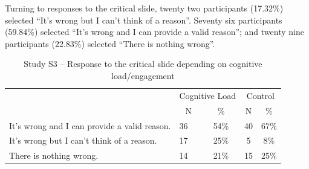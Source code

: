 \documentclass[
  american,
  man,floatsintext]{apa7}
\begin{document}
Turning to responses to the critical slide, twenty two participants (17.32\%) selected \enquote{It's wrong but I can't think of a reason}. Seventy six participants (59.84\%) selected \enquote{It's wrong and I can provide a valid reason}; and twenty nine participants (22.83\%) selected \enquote{There is nothing wrong}.

\begin{table}[tbp]

\begin{center}
\begin{threeparttable}

\caption{\label{tab:tabS3tab1dumb1all}Study S3 – Response to the critical slide depending on cognitive load/engagement}

\begin{tabular}{llccc}
\toprule
 & \multicolumn{2}{c}{Cognitive Load} & \multicolumn{2}{c}{Control} \\
\cmidrule(r){2-3} \cmidrule(r){4-5}
 & \multicolumn{1}{c}{N} & \multicolumn{1}{c}{\%} & \multicolumn{1}{c}{N} & \multicolumn{1}{c}{\%}\\
\midrule
It's wrong and I can provide a valid reason. & 36 & 54\% & 40 & 67\%\\
It's wrong but I can't think of a reason. & 17 & 25\% & 5 & 8\%\\
There is nothing wrong. & 14 & 21\% & 15 & 25\%\\
\bottomrule
\end{tabular}

\end{threeparttable}
\end{center}

\end{table}

\newpage
\end{document}
